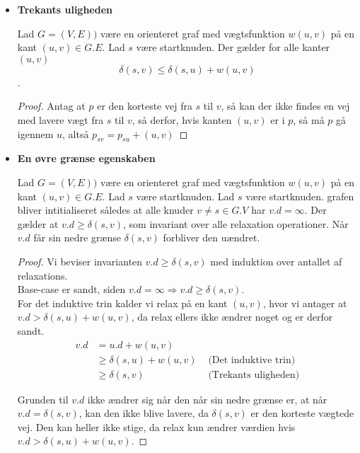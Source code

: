 \begin{itemize}
\item \textbf{Trekants uligheden}
  \begin{lemma}
    Lad $G = (V,E))$ være en orienteret graf med vægtsfunktion $w(u,v)$ på en kant $(u,v) \in G.E$. Lad $s$ være startknuden. Der gælder for alle kanter $(u,v)$
    $$\delta(s,v) \leq \delta(s,u) + w(u,v)$$.
  \end{lemma}

  \begin{proof}
    Antag at $p$ er den korteste vej fra $s$ til $v$, så kan der ikke findes en vej med lavere vægt fra $s$ til $v$, så derfor, hvis kanten $(u,v)$ er i $p$, så må $p$ gå igennem $u$, altså
    $p_{sv} = p_{su} + (u,v)$
  \end{proof}


\item \textbf{En øvre grænse egenskaben}
  \begin{lemma}
    Lad $G = (V,E))$ være en orienteret graf med vægtsfunktion $w(u,v)$ på en kant $(u,v) \in G.E$. Lad $s$ være startknuden. Lad $s$ være startknuden. grafen bliver intitialiseret således at alle knuder $v \neq s \in G.V$ har $v.d = \infty$. Der gælder at $v.d \geq \delta(s,v)$, som invariant over alle relaxation operationer. Når $v.d$ får sin nedre grænse $\delta(s,v)$ forbliver den uændret. 
  \end{lemma}

  \begin{proof}
    Vi beviser invarianten $v.d \geq \delta(s,v)$ med induktion over antallet af relaxations.\\
    Base-case er sandt, siden $v.d = \infty \Rightarrow v.d \geq \delta(s,v)$.\\
    For det induktive trin kalder vi relax på en kant $(u,v)$, hvor vi antager at $v.d > \delta(s, u) + w(u,v)$, da relax ellers ikke ændrer noget og er derfor sandt.\\
    \begin{align*}
      v.d &= u.d + w(u,v)&\\
          &\geq \delta(s,u) + w(u,v) &\text{ (Det induktive trin)}\\
          &\geq \delta(s,v)          &\text{ (Trekants uligheden)}
    \end{align*}

    Grunden til $v.d$ ikke ændrer sig når den når sin nedre grænse er, at når $v.d = \delta(s,v)$, kan den ikke blive lavere, da $\delta(s,v)$ er den korteste vægtede vej. Den kan heller ikke stige, da relax kun ændrer værdien hvis $v.d > \delta(s,u) + w(u,v)$.
  \end{proof}



\end{itemize}
